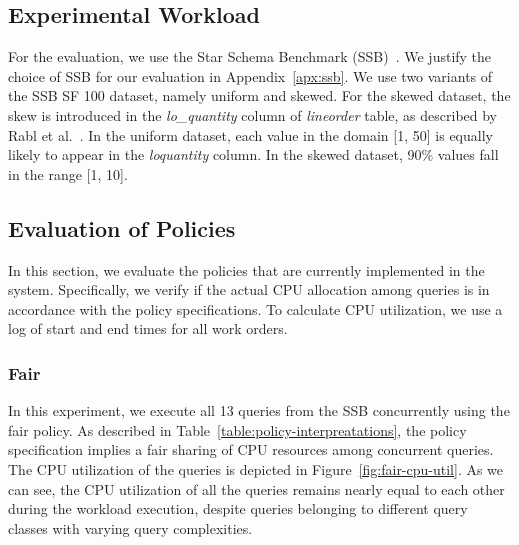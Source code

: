 
\subsection{Experimental Workload}\label{ssec:workload}
For the evaluation, we use the Star Schema Benchmark (SSB)~\cite{ssb}. 
We justify the choice of SSB for our evaluation in Appendix~\ref{apx:ssb}.
We use two variants of the SSB SF 100 dataset, namely uniform and skewed. 
For the skewed dataset, the skew is introduced in the \textit{lo\_quantity} column of \textit{lineorder} table, as described by Rabl et al.~\cite{DBLP:conf/wosp/RablPJOO13}.
In the uniform dataset, each value in the domain [1, 50] is equally likely to appear in the \textit{lo\textunderscore quantity} column.
In the skewed dataset, 90\% values fall in the range [1, 10]. 

\subsection{Evaluation of Policies}\label{ssec:policy-eval}
In this section, we evaluate the policies that are currently implemented in the system.
Specifically, we verify if the actual CPU allocation among queries is in accordance with the policy specifications.
To calculate CPU utilization, we use a log of start and end times for all work orders. %

\subsubsection{Fair}
In this experiment, we execute all 13 queries from the SSB concurrently using the fair policy. 
As described in Table~\ref{table:policy-interpreatations}, the policy specification implies a fair sharing of CPU resources among concurrent queries.
The CPU utilization of the queries is depicted in Figure~\ref{fig:fair-cpu-util}.
As we can see, the CPU utilization of all the queries remains nearly equal to each other during the workload execution, despite queries belonging to different query classes with varying query complexities.

